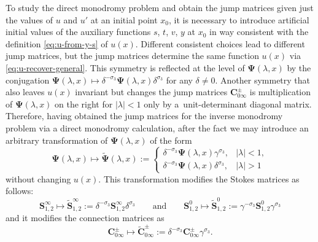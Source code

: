 \documentclass[pdftex]{sigma}
\numberwithin{equation}{section}
\begin{document}
To study the direct monodromy problem and obtain the jump matrices given just the values of $u$ and $u'$ at an initial point $x_0$, it is necessary to introduce artificial initial values of the auxiliary functions $s$, $t$, $v$, $y$ at $x_0$ in way consistent with the definition \eqref{eq:u-from-y-s} of $u(x)$. Different consistent choices lead to different jump matrices, but the jump matrices determine the same function $u(x)$ via \eqref{eq:u-recover-general}. This symmetry is reflected at the level of $\mathbf{\Psi}(\lambda,x)$ by the conjugation
 $\mathbf{\Psi}(\lambda,x)\mapsto \delta^{-\sigma_3}\mathbf{\Psi}(\lambda,x)\delta^{\sigma_3}$
 for any $\delta\neq 0$. Another symmetry that also leaves $u(x)$ invariant but changes the jump matrices $\mathbf{C}_{0\infty}^\pm$ is multiplication of $\mathbf{\Psi}(\lambda,x)$ on the right for $|\lambda|<1$ only by a~unit-determinant diagonal matrix. Therefore, having obtained the jump matrices for the inverse monodromy problem via a direct monodromy calculation, after the fact we may introduce an arbitrary transformation of $\mathbf{\Psi}(\lambda,x)$ of the form
\begin{equation}\label{eq:transf}
 \boldsymbol \Psi(\lambda,x)\mapsto \widetilde{\mathbf{\Psi}}(\lambda,x):=\begin{cases}
 \delta^{-\sigma_3} \boldsymbol \Psi(\lambda,x)\gamma^{\sigma_3},&|\lambda|<1,\\
 \delta^{-\sigma_3}\boldsymbol \Psi(\lambda,x)\delta^{\sigma_3},&|\lambda|>1
 \end{cases}
\end{equation}
without changing $u(x)$. This transformation modifies the Stokes matrices as follows:
 \begin{equation}\label{eq:stokes-transformation}
 \mathbf{S}^\infty_{1,2}\mapsto \widetilde{\mathbf{S}}^\infty_{1,2}:=\delta^{-\sigma_3}\mathbf{S}^\infty_{1,2}\delta^{\sigma_3}\qquad\text{and}\qquad
 \mathbf{S}^0_{1,2}\mapsto \widetilde{\mathbf{S}}^0_{1,2}:=\gamma^{-\sigma_3}\mathbf{S}^0_{1,2}\gamma^{\sigma_3}
 \end{equation}
 and it modifies the connection matrices as
 \begin{equation}
 \mathbf{C}_{0\infty}^\pm\mapsto\widetilde{\mathbf{C}}_{0\infty}^\pm:=\delta^{-\sigma_3}\mathbf{C}_{0\infty}^\pm\gamma^{\sigma_3}.
 \label{eq:connection-modify}
 \end{equation}
\end{document}
